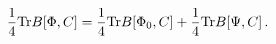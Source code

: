 \begin{equation}
\frac{1}{4}{\rm Tr}B[\Phi ,C]=\frac{1}{4}{\rm Tr}B[\Phi _{0},C]+\frac{1}{4}%
{\rm Tr}B[\Psi ,C]\,.  \label{ghost}
\end{equation}

